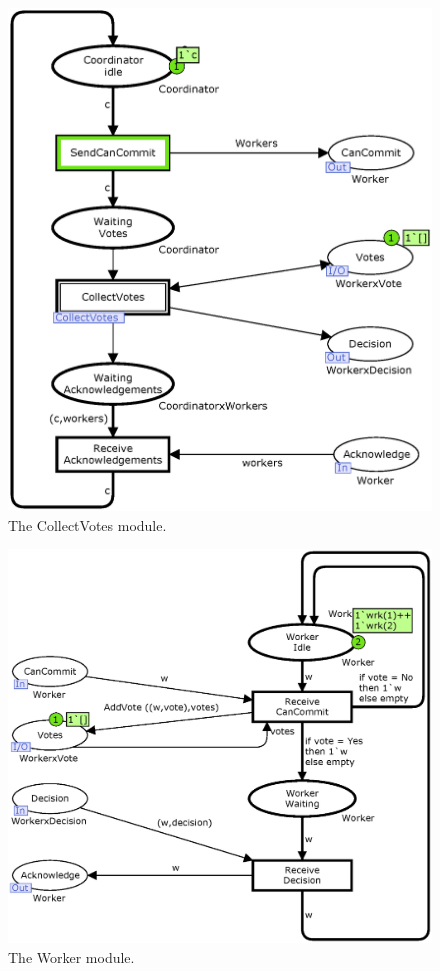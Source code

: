 \begin{figure}[t]
\centering
\includegraphics[width=\columnwidth]{figures/Coordinator.eps}
\caption{The CollectVotes module.}
\end{figure}

\begin{figure}[t]
\centering
\includegraphics[width=\columnwidth]{figures/Worker.eps}
\caption{The Worker module.}
\end{figure}

